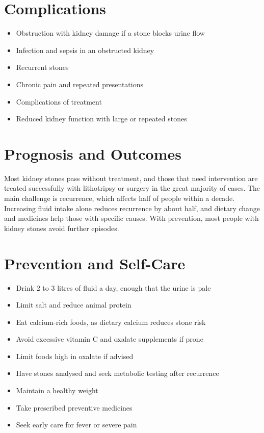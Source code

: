 \section*{Complications}
\begin{itemize}
    \item Obstruction with kidney damage if a stone blocks urine flow
    \item Infection and sepsis in an obstructed kidney
    \item Recurrent stones
    \item Chronic pain and repeated presentations
    \item Complications of treatment
    \item Reduced kidney function with large or repeated stones
\end{itemize}

\section*{Prognosis and Outcomes}
Most kidney stones pass without treatment, and those that need intervention are treated successfully with lithotripsy or surgery in the great majority of cases. The main challenge is recurrence, which affects half of people within a decade. Increasing fluid intake alone reduces recurrence by about half, and dietary change and medicines help those with specific causes. With prevention, most people with kidney stones avoid further episodes.

\section*{Prevention and Self-Care}
\begin{itemize}
    \item Drink 2 to 3 litres of fluid a day, enough that the urine is pale
    \item Limit salt and reduce animal protein
    \item Eat calcium-rich foods, as dietary calcium reduces stone risk
    \item Avoid excessive vitamin C and oxalate supplements if prone
    \item Limit foods high in oxalate if advised
    \item Have stones analysed and seek metabolic testing after recurrence
    \item Maintain a healthy weight
    \item Take prescribed preventive medicines
    \item Seek early care for fever or severe pain
\end{itemize}

